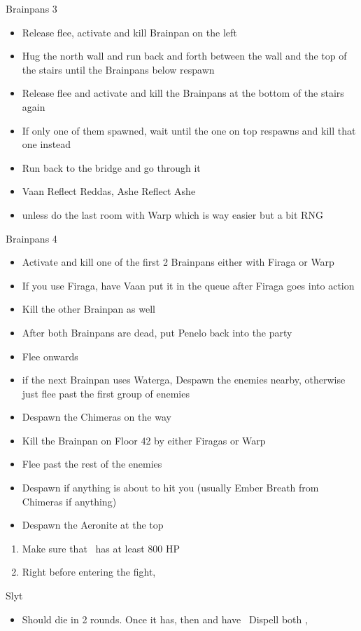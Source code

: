 \begin{battle}{Brainpans 3}
\begin{itemize}
		\item  Release flee, activate and kill Brainpan on the left
		\item  Hug the north wall and run back and forth between the wall and the top of the stairs until the Brainpans below respawn
		\item  Release flee and activate and kill the Brainpans at the bottom of the stairs again
		\item  If only one of them spawned, wait until the one on top respawns and kill that one instead
		\item  Run back to the bridge and go through it
		\item  Vaan Reflect Reddas, Ashe Reflect Ashe
		\item  unless do the last room with Warp which is way easier but a bit RNG
	\end{itemize}
\end{battle}
\begin{battle}{Brainpans 4}
	\begin{itemize}
		\item  Activate and kill one of the first 2 Brainpans either with Firaga or Warp
		\item  If you use Firaga, have Vaan put it in the queue after Firaga goes into action
		\item  Kill the other Brainpan as well
		\item  After both Brainpans are dead, put Penelo back into the party
		\item  Flee onwards \item  if the next Brainpan uses Waterga, Despawn the enemies nearby, otherwise just flee past the first group of enemies
		\item  Despawn the Chimeras on the way
		\item  Kill the Brainpan on Floor 42 by either Firagas or Warp
		\item  Flee past the rest of the enemies
		\item  Despawn if anything is about to hit you (usually Ember Breath from Chimeras if anything)
		\item  Despawn the Aeronite at the top
	\end{itemize}
\end{battle}
\begin{enumerate}
	\penelof Reflect \penelo
	\ashef Reflect \ashe
	\item Make sure that \vaan\ has at least 800 HP
	\item Right before entering the fight, \GirlsGambitOn
\end{enumerate}
\begin{battle}{Slyt}
	\begin{itemize}
		\vaanf Confuse between the rounds of \ashe, \penelo's spells
		\item Should die in 2 rounds. Once it has, then \GirlsGambitOff and have \penelo\ Dispell both \ashe, \penelo
	\end{itemize}
\end{battle}